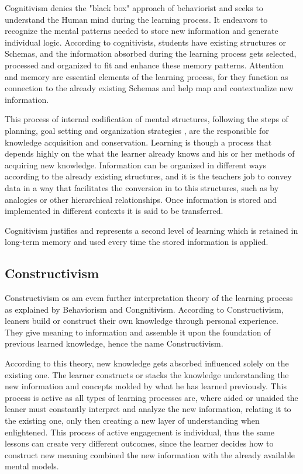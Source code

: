 Cognitivism denies the "black box" approach of behaviorist and seeks to understand
the Human mind during the learning process. It endeavors to recognize the mental 
patterns needed to store new information and generate individual logic.
According to cognitivists, students have existing structures or Schemas, and 
the information absorbed during the learning process gets selected, processed
and organized to fit and enhance these memory patterns. \cite{johnson}
Attention and memory are essential elements of the learning process, for they 
function as connection to the already existing Schemas and help map and contextualize
new information. 

This process of internal codification of mental structures, following the steps
of planning, goal setting and organization strategies \cite{johnson}, are the 
responsible for knowledge acquisition and conservation. Learning is though a 
process that depends highly on the what the learner already knows and his or her
methods of acquiring new knowledge. Information can be organized in different 
ways according to the already existing structures, and it is the teachers 
job to convey data in a way that facilitates the conversion in to this structures, 
such as by analogies or other hierarchical relationships. Once information is 
stored and implemented in different contexts it is said to be transferred. \cite{schunk}

Cognitivism justifies and represents a second level of learning which is retained
in long-term memory and used every time the stored information is applied.




\subsection{Constructivism}

Constructivism os am evem further interpretation theory of the learning process 
as explained by Behaviorism and Congnitivism. According to Constructivism, leaners
build or construct their own knowledge through personal experience. They give meaning
to information and assemble it upon the foundation of previous learned knowledge, 
hence the name Constructivism.

According to this theory, new knowledge gets absorbed influenced solely on the 
existing one. The learner constructs or stacks the knowledge understanding the new 
information and concepts molded by what he has learned previously. This process is
active \cite{adler_1970} as all types of learning processes are, where aided or 
unaided the leaner must constantly interpret and analyze the new information,
relating it to the existing one, only then creating a new layer of understanding 
when enlightened. This process of active engagement is individual, thus the same 
lessons can create very different outcomes, since the learner decides how to construct
new meaning combined the new information with the already available mental models.


